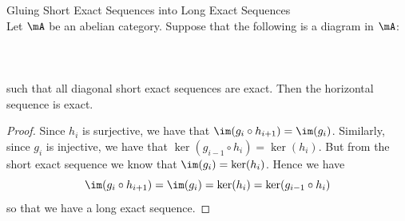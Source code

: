 \documentclass[a4paper]{article}
\begin{document}
\begin{prp}{Gluing Short Exact Sequences into Long Exact Sequences}{}\\
Let $\mA$ be an abelian category. Suppose that the following is a diagram in $\mA$: \\~\\
 \\~\\
such that all diagonal short exact sequences are exact. Then the horizontal sequence is exact. 
\begin{proof}
Since $h_i$ is surjective, we have that $\im(g_i\circ h_{i+1})=\im(g_i)$. Similarly, since $g_i$ is injective, we have that $\ker(g_{i-1}\circ h_i)=\ker(h_i)$. But from the short exact sequence we know that $\im(g_i)=\ker(h_i)$. Hence we have $$\im(g_i\circ h_{i+1})=\im(g_i)=\ker(h_i)=\ker(g_{i-1}\circ h_i)$$ so that we have a long exact sequence. 
\end{proof}
\end{prp}
\end{document}
